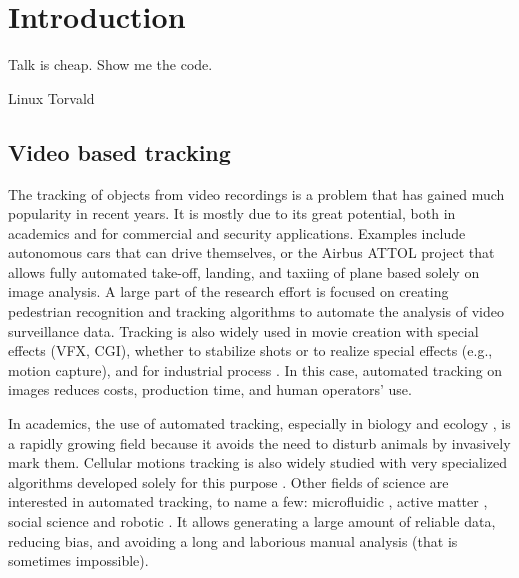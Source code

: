 \chapter{Introduction}

  \epigraph{Talk is cheap. Show me the code.}{Linux Torvald}

	\section{Video based tracking}
    The tracking of objects from video recordings is a problem that has gained much popularity in recent years. It is mostly due to its great potential, both in academics and for commercial and security applications. Examples include autonomous cars that can drive themselves, or the Airbus ATTOL project \cite{ATTOL} that allows fully automated take-off, landing, and taxiing of plane based solely on image analysis. A large part of the research effort is focused on creating pedestrian recognition and tracking algorithms to automate the analysis of video surveillance data. Tracking is also widely used in movie creation with special effects (VFX, CGI), whether to stabilize shots or to realize special effects (e.g., motion capture), and for industrial process \cite{luo1988adaptive}. In this case, automated tracking on images reduces costs, production time, and human operators' use.

    In academics, the use of automated tracking, especially in biology and ecology \cite{dell2014automated,risse2017fimtrack}, is a rapidly growing field because it avoids the need to disturb animals by invasively mark them. Cellular motions tracking is also widely studied with very specialized algorithms developed solely for this purpose \cite{juang2009tracking,dewan2011tracking}. Other fields of science are interested in automated tracking, to name a few: microfluidic \cite{jeong2018accurately}, active matter \cite{bricard2013emergence}, social science \cite{ali2012multiple} and robotic \cite{treptow2004real}. It allows generating a large amount of reliable data, reducing bias, and avoiding a long and laborious manual analysis (that is sometimes impossible).

